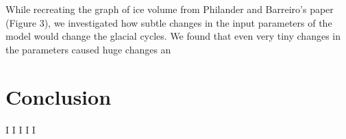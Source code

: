 \documentclass[11pt]{article}
\begin{document}


While recreating the graph of ice volume from Philander and Barreiro's paper (Figure 3), we investigated how subtle changes in the input parameters of the model would change the glacial cycles.
We found that even very tiny changes in the parameters caused huge changes an


\section{Conclusion} 



\begin{thebibliography}{9}
		I
		I
        I
		I%
        I%
\end{thebibliography}
\end{document}
